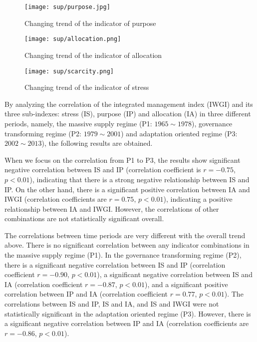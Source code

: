 \documentclass[draft,wrr]{../agutexSI2019}
\begin{document}
\begin{article}
\begin{figure}[htb]
\centering
\texttt{[image: sup/purpose.jpg]}
\caption{Changing trend of the indicator of purpose}\label{fig:purpose}
\end{figure}

\begin{figure}[htb]
\centering
\texttt{[image: sup/allocation.png]}
\caption{Changing trend of the indicator of allocation}\label{fig:allocation}
\end{figure}

\begin{figure}[htb]
\centering
\texttt{[image: sup/scarcity.png]}
\caption{Changing trend of the indicator of stress}\label{fig:scarcity}
\end{figure}


By analyzing the correlation of the integrated management index (IWGI) and its three sub-indexes: stress (IS), purpose (IP) and allocation (IA) in three different periods, namely, the massive supply regime (P1: $1965 \sim 1978$), governance transforming regime (P2: $1979 \sim 2001$) and adaptation oriented regime (P3: $2002 \sim 2013$), the following results are obtained.

When we focus on the correlation from P1 to P3, the results show significant negative correlation between IS and IP (correlation coefficient is $r = -0.75$, $p < 0.01$), indicating that there is a strong negative relationship between IS and IP.
On the other hand, there is a significant positive correlation between IA and IWGI (correlation coefficients are $r = 0.75$, $p < 0.01$), indicating a positive relationship between IA and IWGI. However, the correlations of other combinations are not statistically significant overall.

The correlations between time periods are very different with the overall trend above.
There is no significant correlation between any indicator combinations in the massive supply regime (P1).
In the governance transforming regime (P2), there is a significant negative correlation between IS and IP (correlation coefficient $r = -0.90$, $p < 0.01$), a significant negative correlation between IS and IA (correlation coefficient $r = -0.87$, $p < 0.01$), and a significant positive correlation between IP and IA (correlation coefficient $r = 0.77$, $p < 0.01$).
The correlations between IS and IP, IS and IA, and IS and IWGI were not statistically significant in the adaptation oriented regime (P3). However, there is a significant negative correlation between IP and IA (correlation coefficients are $r = -0.86$, $p < 0.01$).


\end{article}
\end{document}
